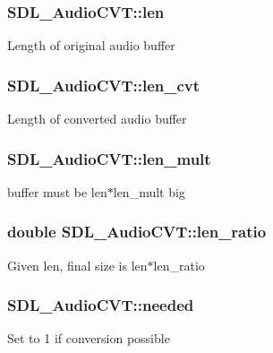 \subsubsection[{len}]{ S\+D\+L\+\_\+\+Audio\+C\+V\+T\+::len}\label{structSDL__AudioCVT_aeaeb8c5a63c3ab96471fbfdf412c78ff}
Length of original audio buffer \hypertarget{structSDL__AudioCVT_a5c60163f34d1947e5b166c23aba9879d}{}
\subsubsection[{len\+\_\+cvt}]{ S\+D\+L\+\_\+\+Audio\+C\+V\+T\+::len\+\_\+cvt}\label{structSDL__AudioCVT_a5c60163f34d1947e5b166c23aba9879d}
Length of converted audio buffer \hypertarget{structSDL__AudioCVT_ac9662d47cf2348b82b27b151150116b0}{}
\subsubsection[{len\+\_\+mult}]{ S\+D\+L\+\_\+\+Audio\+C\+V\+T\+::len\+\_\+mult}\label{structSDL__AudioCVT_ac9662d47cf2348b82b27b151150116b0}
buffer must be len$\ast$len\+\_\+mult big \hypertarget{structSDL__AudioCVT_a5628ff5ccf711de9d77c0a4a9f57d2f0}{}
\subsubsection[{len\+\_\+ratio}]{\setlength{\rightskip}{0pt plus 5cm}double S\+D\+L\+\_\+\+Audio\+C\+V\+T\+::len\+\_\+ratio}\label{structSDL__AudioCVT_a5628ff5ccf711de9d77c0a4a9f57d2f0}
Given len, final size is len$\ast$len\+\_\+ratio \hypertarget{structSDL__AudioCVT_ac600a035a48df05e14d3712fd6953ad4}{}
\subsubsection[{needed}]{ S\+D\+L\+\_\+\+Audio\+C\+V\+T\+::needed}\label{structSDL__AudioCVT_ac600a035a48df05e14d3712fd6953ad4}
Set to 1 if conversion possible \hypertarget{structSDL__AudioCVT_ad886122c23a6673073baace31bff3b6c}{}

